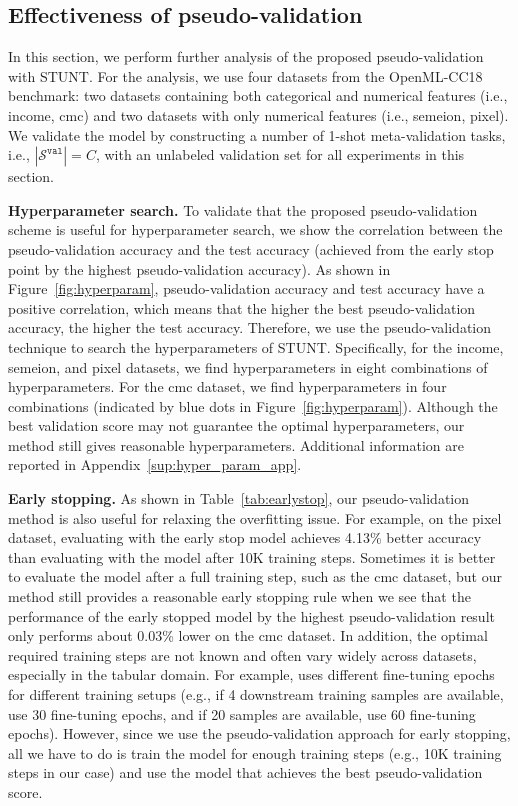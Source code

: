 \subsection{Effectiveness of pseudo-validation}
\label{sec:pseudo_val_exp}

In this section, we perform further analysis of the proposed pseudo-validation with STUNT. For the analysis, we use four datasets from the OpenML-CC18 benchmark: two datasets containing both categorical and numerical features (i.e., income, cmc) and two datasets with only numerical features (i.e., semeion, pixel). We validate the model by constructing a number of 1-shot meta-validation tasks, i.e., $|\mathcal{S}^{\mathtt{val}}|=C$, with an unlabeled validation set for all experiments in this section.

\textbf{Hyperparameter search.} To validate that the proposed pseudo-validation scheme is useful for hyperparameter search, we show the correlation between the pseudo-validation accuracy and the test accuracy (achieved from the early stop point by the highest pseudo-validation accuracy). As shown in Figure~\ref{fig:hyperparam}, pseudo-validation accuracy and test accuracy have a positive correlation, which means that the higher the best pseudo-validation accuracy, the higher the test accuracy. Therefore, we use the pseudo-validation technique to search the hyperparameters of STUNT. Specifically, for the income, semeion, and pixel datasets, we find hyperparameters in eight combinations of hyperparameters. For the cmc dataset, we find hyperparameters in four combinations (indicated by blue dots in Figure~\ref{fig:hyperparam}).
Although the best validation score may not guarantee the optimal hyperparameters, our method still gives reasonable hyperparameters. Additional information are reported in Appendix~\ref{sup:hyper_param_app}.

\textbf{Early stopping.} As shown in Table~\ref{tab:earlystop}, our pseudo-validation method is also useful for relaxing the overfitting issue. For example, on the pixel dataset, evaluating with the early stop model achieves 4.13\% better accuracy than evaluating with the model after 10K training steps. Sometimes it is better to evaluate the model after a full training step, such as the cmc dataset, but our method still provides a reasonable early stopping rule when we see that the performance of the early stopped model by the highest pseudo-validation result only performs about 0.03\% lower on the cmc dataset. In addition, the optimal required training steps are not known and often vary widely across datasets, especially in the tabular domain. For example, \citet{levin2022transfer} uses different fine-tuning epochs for different training setups (e.g., if 4 downstream training samples are available, use 30 fine-tuning epochs, and if 20 samples are available, use 60 fine-tuning epochs). However, since we use the pseudo-validation approach for early stopping, all we have to do is train the model for enough training steps (e.g., 10K training steps in our case) and use the model that achieves the best pseudo-validation score.

